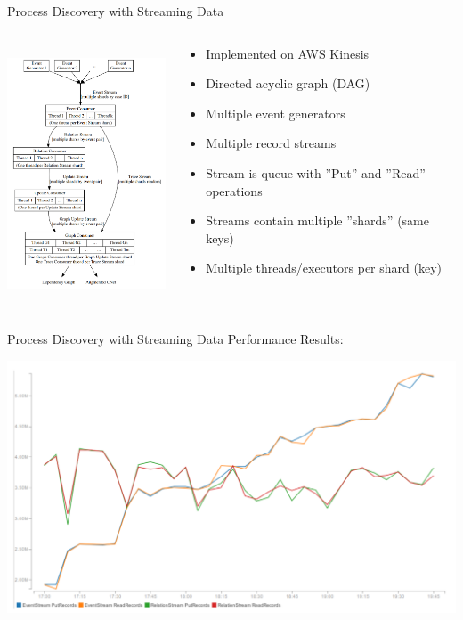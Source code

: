 \documentclass[ignorenonframetext,xcolor=x11names]{beamer}
\begin{document}
\begin{frame}{Process Discovery with Streaming Data}
\begin{columns}
\begin{column}{.4\textwidth}
\includegraphics[height=3in]{screen3.png}
\end{column}
\begin{column}{.6\textwidth}
\begin{itemize}
   \item Implemented on AWS Kinesis
   \item Directed acyclic graph (DAG)
   \item Multiple event generators
   \item Multiple record streams
   \item Stream is queue with ''Put'' and ''Read'' operations
   \item Streams contain multiple ''shards'' (same keys)
   \item Multiple threads/executors per shard (key)
\end{itemize}
\end{column}
\end{columns}
\end{frame}

\begin{frame}{Process Discovery with Streaming Data}
Performance Results:
\begin{center}
\includegraphics[width=\textwidth]{screen4.png}
\end{center}
\end{frame}
\end{document}
